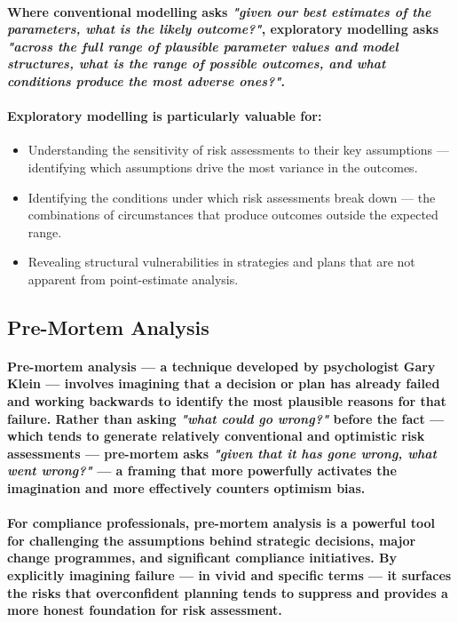 \paragraph{Where conventional modelling asks \textit{"given our best estimates of the parameters, what is the likely outcome?"}, exploratory modelling asks \textit{"across the full range of plausible parameter values and model structures, what is the range of possible outcomes, and what conditions produce the most adverse ones?"}.}
\paragraph{Exploratory modelling is particularly valuable for:}
\begin{itemize}
  \item{Understanding the sensitivity of risk assessments to their key assumptions — identifying which assumptions drive the most variance in the outcomes.}
  \item{Identifying the conditions under which risk assessments break down — the combinations of circumstances that produce outcomes outside the expected range.}
  \item{Revealing structural vulnerabilities in strategies and plans that are not apparent from point-estimate analysis.}
\end{itemize}

\subsection{Pre-Mortem Analysis}
\paragraph{\textbf{Pre-mortem analysis} — a technique developed by psychologist Gary Klein — involves imagining that a decision or plan has already failed and working backwards to identify the most plausible reasons for that failure. Rather than asking \textit{"what could go wrong?"} before the fact — which tends to generate relatively conventional and optimistic risk assessments — pre-mortem asks \textit{"given that it has gone wrong, what went wrong?"} — a framing that more powerfully activates the imagination and more effectively counters optimism bias.}
\paragraph{For compliance professionals, pre-mortem analysis is a powerful tool for challenging the assumptions behind strategic decisions, major change programmes, and significant compliance initiatives. By explicitly imagining failure — in vivid and specific terms — it surfaces the risks that overconfident planning tends to suppress and provides a more honest foundation for risk assessment.}
